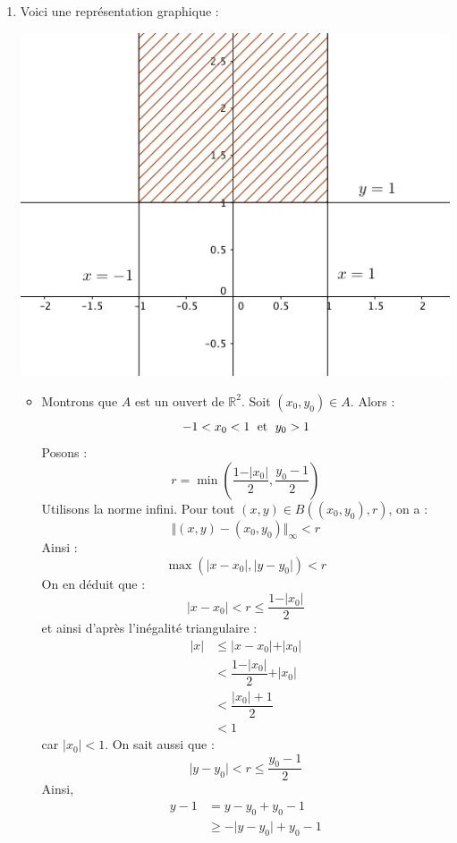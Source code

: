 \documentclass[a4paper,10pt]{report}
\begin{document}

\begin{enumerate}
\item Voici une représentation graphique : 

\begin{center}
\includegraphics[scale=0.5]{im1}
\end{center}
\begin{itemize}
\item Montrons que $A$ est un ouvert de $\mathbb{R}^2$. Soit $(x_0,y_0) \in A$. Alors :
$$ -1 < x_0 < 1 \; \hbox{ et } \; y_0>1$$
Posons :
$$ r = \min \left( \dfrac{1-\vert x_0\vert}{2}, \dfrac{y_0-1}{2} \right)$$
Utilisons la norme infini. Pour tout $(x,y) \in B((x_0,y_0),r)$, on a :
$$ \Vert (x,y)-(x_0,y_0) \Vert_{\infty} <r $$
Ainsi :
$$ \max (\vert x-x_0 \vert, \vert y-y_0 \vert)<r$$
On en déduit que :
$$ \vert x-x_0 \vert < r \leq \dfrac{1-\vert x_0\vert}{2}$$
et ainsi d'après l'inégalité triangulaire :
\begin{align*}
\vert x \vert & \leq \vert x-x_0 \vert + \vert x_0 \vert \\
& <\dfrac{1-\vert x_0\vert}{2} + \vert x_0 \vert \\ 
& < \dfrac{\vert x_0 \vert + 1 }{2}\\
& < 1
\end{align*}
car $\vert x_0 \vert <1$. On sait aussi que :
$$  \vert y-y_0 \vert < r \leq \dfrac{y_0-1}{2}$$
Ainsi, 
\begin{align*}
y-1 &= y-y_0 + y_0-1 \\
& \geq - \vert y- y_0 \vert + y_0-1 \\

\end{align*}
\end{itemize}
\end{enumerate}
\end{document}
